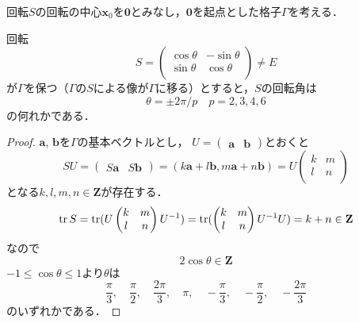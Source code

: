回転$S$の回転の中心$\mathbf x_0$を$\mathbf 0$とみなし，$\mathbf 0$を起点とした格子$\Gamma $を考える．
\begin{Prop}[結晶条件]
回転
\[
	S=\begin{pmatrix}
		\cos \theta &-\sin \theta\\
		\sin \theta& \cos \theta\\
	\end{pmatrix}\neq E
\]
が$\Gamma $を保つ（$\Gamma $の$S$による像が$\Gamma $に移る）とすると，$S$の回転角は
\[
	\theta=\pm 2\pi/p\quad p=2, 3,4,6
\]
の何れかである．
\end{Prop}
\begin{proof}
$\mathbf a$, $\mathbf b$を$\Gamma $の基本ベクトルとし，
$U=\begin{pmatrix}\mathbf a&\mathbf b\end{pmatrix}$とおくと
\[
	SU
	=
	\begin{pmatrix}S\mathbf a& S\mathbf b\end{pmatrix}
	=
	(k\mathbf a+l\mathbf b, m\mathbf a+n\mathbf b)
	=
	U\begin{pmatrix}
		k &m\\
		l& n\\
	\end{pmatrix}
\]
となる$k,l,m,n\in \mathbf Z$が存在する．
\[
	\operatorname{tr} S
	=
	\operatorname{tr} (U\begin{pmatrix}
		k &m\\
		l& n\\
	\end{pmatrix}U^{-1})
	=
	\operatorname{tr} (\begin{pmatrix}
		k &m\\
		l& n\\
	\end{pmatrix}U^{-1}U)
	=
	k+n \in \mathbf Z
\]
なので
\[
	2\cos \theta \in \mathbf Z
\]
$-1\le \cos \theta\le 1$より$\theta$は
\[
	\frac{\pi}{3},\quad\frac{\pi}{2},\quad\frac{2\pi}{3},\quad
	\pi,\quad-\frac{\pi}{3},\quad -\frac{\pi}{2},\quad-\frac{2\pi}{3}
\]
のいずれかである．
\end{proof}



